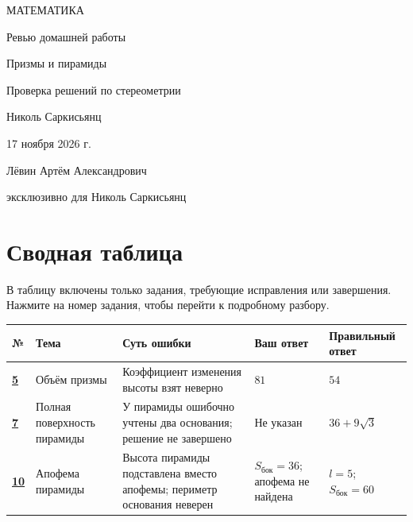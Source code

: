 \documentclass[a4paper,12pt]{article}
\begin{document}
\begin{titlepage}
\thispagestyle{empty}
\centering
\vspace*{30mm}
{\large\textcolor{darkaccent}{МАТЕМАТИКА}\par}
\vspace{29mm}
{\LARGE\textcolor{ink}{Ревью домашней работы}\par}
\vspace{9mm}
{\Large\textcolor{accent}{Призмы и пирамиды}\par}
\vspace{16mm}
{\normalsize\textcolor{muted}{Проверка решений по стереометрии}\par}
\vfill
{\large Николь Саркисьянц\par}
\vspace{11mm}
{17 ноября 2026 г.\par}
\vspace{17mm}
{\small Лёвин Артём Александрович\par}
\vspace{2mm}
{\small эксклюзивно для Николь Саркисьянц\par}
\vspace{14mm}
\end{titlepage}

\section*{Сводная таблица}
\textcolor{muted}{В таблицу включены только задания, требующие исправления или завершения. Нажмите на номер задания, чтобы перейти к подробному разбору.}
\par\vspace{5mm}
\small
\begin{tabularx}{\linewidth}{@{}>{\centering\arraybackslash}p{10mm} >{\raggedright\arraybackslash}p{25mm} >{\raggedright\arraybackslash}X >{\raggedright\arraybackslash}p{23mm} >{\raggedright\arraybackslash}p{31mm}@{}}
\toprule
\textbf{№} & \textbf{Тема} & \textbf{Суть ошибки} & \textbf{Ваш ответ} & \textbf{Правильный ответ}\\
\midrule
\hyperref[task:5]{\textbf{5}} & Объём призмы & Коэффициент изменения высоты взят неверно & $81$ & $54$\\
\addlinespace[4pt]
\hyperref[task:7]{\textbf{7}} & Полная поверхность пирамиды & У пирамиды ошибочно учтены два основания; решение не завершено & Не указан & $36+9\sqrt3$\\
\addlinespace[4pt]
\hyperref[task:10]{\textbf{10}} & Апофема пирамиды & Высота пирамиды подставлена вместо апофемы; периметр основания неверен & $S_{\text{бок}}=36$; апофема не найдена & $l=5$; $S_{\text{бок}}=60$\\
\bottomrule
\end{tabularx}
\normalsize
\end{document}
